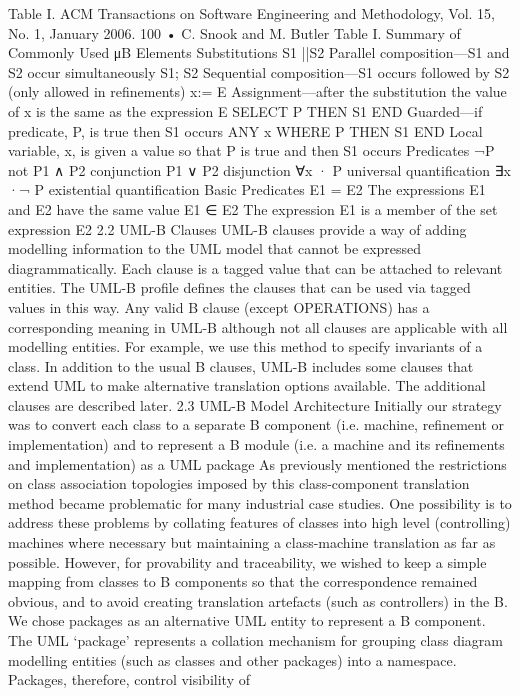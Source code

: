 Table I.
ACM Transactions on Software Engineering and Methodology, Vol. 15, No. 1, January 2006.
100 • C. Snook and M. Butler
Table I. Summary of Commonly Used μB Elements
Substitutions
S1 ||S2 Parallel composition—S1 and S2 occur simultaneously
S1; S2 Sequential composition—S1 occurs followed by S2 (only
allowed in refinements)
x:= E Assignment—after the substitution the value of x is the same
as the expression E
SELECT P THEN S1 END Guarded—if predicate, P, is true then S1 occurs
ANY x WHERE P THEN S1 END Local variable, x, is given a value so that P is true and then
S1 occurs
Predicates
¬P not
P1 ∧ P2 conjunction
P1 ∨ P2 disjunction
∀x · P universal quantification
∃x ·¬ P existential quantification
Basic Predicates
E1 = E2 The expressions E1 and E2 have the same value
E1 ∈ E2 The expression E1 is a member of the set expression E2
2.2 UML-B Clauses
UML-B clauses provide a way of adding modelling information to the UML
model that cannot be expressed diagrammatically. Each clause is a tagged value
that can be attached to relevant entities. The UML-B profile defines the clauses
that can be used via tagged values in this way. Any valid B clause (except OPERATIONS) has a corresponding meaning in UML-B although not all clauses
are applicable with all modelling entities. For example, we use this method
to specify invariants of a class. In addition to the usual B clauses, UML-B includes some clauses that extend UML to make alternative translation options
available. The additional clauses are described later.
2.3 UML-B Model Architecture
Initially our strategy was to convert each class to a separate B component (i.e.
machine, refinement or implementation) and to represent a B module (i.e. a
machine and its refinements and implementation) as a UML package As previously mentioned the restrictions on class association topologies imposed by this
class-component translation method became problematic for many industrial
case studies. One possibility is to address these problems by collating features
of classes into high level (controlling) machines where necessary but maintaining a class-machine translation as far as possible. However, for provability and
traceability, we wished to keep a simple mapping from classes to B components
so that the correspondence remained obvious, and to avoid creating translation
artefacts (such as controllers) in the B. We chose packages as an alternative
UML entity to represent a B component. The UML ‘package’ represents a collation mechanism for grouping class diagram modelling entities (such as classes
and other packages) into a namespace. Packages, therefore, control visibility of
